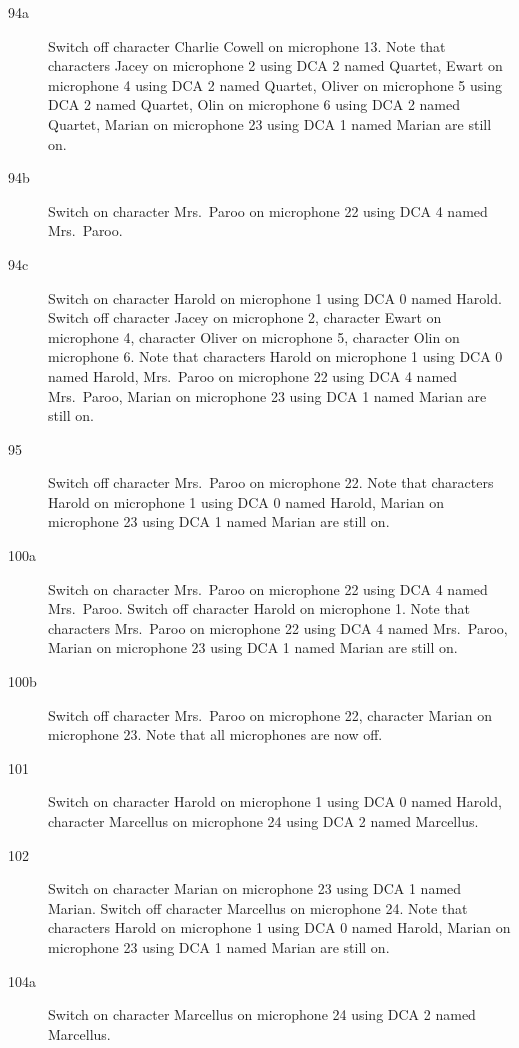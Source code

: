 \begin{description}
\item[94a]
Switch off character Charlie Cowell on microphone 13. Note that characters Jacey on microphone 2 using DCA 2 named Quartet, Ewart on microphone 4 using DCA 2 named Quartet, Oliver on microphone 5 using DCA 2 named Quartet, Olin on microphone 6 using DCA 2 named Quartet, Marian on microphone 23 using DCA 1 named Marian are still on.  

\item[94b]
Switch on character Mrs.~Paroo on microphone 22 using DCA 4 named Mrs.~Paroo. 

\item[94c]
Switch on character Harold on microphone 1 using DCA 0 named Harold. Switch off character Jacey on microphone 2, character Ewart on microphone 4, character Oliver on microphone 5, character Olin on microphone 6. Note that characters Harold on microphone 1 using DCA 0 named Harold, Mrs.~Paroo on microphone 22 using DCA 4 named Mrs.~Paroo, Marian on microphone 23 using DCA 1 named Marian are still on.  

\item[95]
Switch off character Mrs.~Paroo on microphone 22. Note that characters Harold on microphone 1 using DCA 0 named Harold, Marian on microphone 23 using DCA 1 named Marian are still on.  

\item[100a]
Switch on character Mrs.~Paroo on microphone 22 using DCA 4 named Mrs.~Paroo. Switch off character Harold on microphone 1. Note that characters Mrs.~Paroo on microphone 22 using DCA 4 named Mrs.~Paroo, Marian on microphone 23 using DCA 1 named Marian are still on.  

\item[100b]
Switch off character Mrs.~Paroo on microphone 22, character Marian on microphone 23. Note that all microphones are now off.

\item[101]
Switch on character Harold on microphone 1 using DCA 0 named Harold, character Marcellus on microphone 24 using DCA 2 named Marcellus. 

\item[102]
Switch on character Marian on microphone 23 using DCA 1 named Marian. Switch off character Marcellus on microphone 24. Note that characters Harold on microphone 1 using DCA 0 named Harold, Marian on microphone 23 using DCA 1 named Marian are still on.  

\item[104a]
Switch on character Marcellus on microphone 24 using DCA 2 named Marcellus. 


\end{description}
